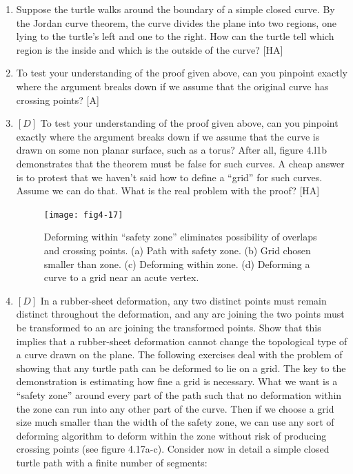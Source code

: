 \documentclass{book}
\begin{document}
\begin{enumerate}
\item Suppose the turtle walks around the boundary of a simple closed
curve. By the Jordan curve theorem, the curve divides the plane into
two regions, one lying to the turtle's left and one to the right. How can
the turtle tell which region is the inside and which is the outside of the
curve? [HA]

\item To test your understanding of the proof given above, can you pinpoint
exactly where the argument breaks down if we assume that the original
curve has crossing points? [A]

\item $[D]$ To test your understanding of the proof given above, can you
pinpoint exactly where the argument breaks down if we assume that
the curve is drawn on some non planar surface, such as a torus? After
all, figure 4.l1b demonstrates that the theorem must be false for such
curves. A cheap answer is to protest that we haven't said how to define
a ``grid'' for such curves. Assume we can do that. What is the real
problem with the proof? [HA]

\begin{figure}
\begin{center}
\texttt{[image: fig4-17]}
\caption{Deforming within ``safety zone'' eliminates possibility of overlaps and crossing points. (a) Path with safety zone. (b) Grid chosen smaller than zone. (c) Deforming within zone. (d) Deforming a curve to a grid near an acute vertex.}
\end{center}
\end{figure}

\item $[D]$ In a rubber-sheet deformation, any two distinct points must
remain distinct throughout the deformation, and any arc joining the
two points must be transformed to an arc joining the transformed points.
Show that this implies that a rubber-sheet deformation cannot change
the topological type of a curve drawn on the plane.
The following exercises deal with the problem of showing that any
turtle path can be deformed to lie on a grid. The key to the demonstration is estimating how fine a grid is necessary. What we want is a ``safety
zone'' around every part of the path such that no deformation within
the zone can run into any other part of the curve. Then if we choose
a grid size much smaller than the width of the safety zone, we can use
any sort of deforming algorithm to deform within the zone without risk
of producing crossing points (see figure 4.17a-c). Consider now in detail
a simple closed turtle path with a finite number of segments:


\end{enumerate}
\end{document}
